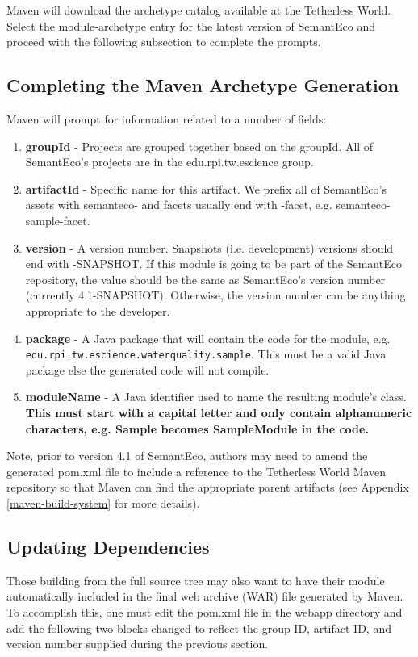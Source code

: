 \documentclass[letterpaper]{report}
\begin{document}
Maven will download the archetype catalog available at the Tetherless World. Select the module-archetype entry for the latest version of SemantEco and proceed with the following subsection to complete the prompts.

\subsection{Completing the Maven Archetype Generation}
\label{complete-maven-archetype}

Maven will prompt for information related to a number of fields:

\begin{enumerate}
\item \textbf{groupId} - Projects are grouped together based on the groupId. All of SemantEco's projects are in the edu.rpi.tw.escience group.
\item \textbf{artifactId} - Specific name for this artifact. We prefix all of SemantEco's assets with semanteco- and facets usually end with -facet, e.g. semanteco-sample-facet.
\item \textbf{version} - A version number. Snapshots (i.e. development) versions should end with -SNAPSHOT. If this module is going to be part of the SemantEco repository, the value should be the same as SemantEco's version number (currently 4.1-SNAPSHOT). Otherwise, the version number can be anything appropriate to the developer.
\item \textbf{package} - A Java package that will contain the code for the module, e.g. \\\texttt{edu.rpi.tw.escience.waterquality.sample}. This must be a valid Java package else the generated code will not compile.
\item \textbf{moduleName} - A Java identifier used to name the resulting module's class. \textbf{This must start with a capital letter and only contain alphanumeric characters, e.g. Sample becomes SampleModule in the code.}
\end{enumerate}

Note, prior to version 4.1 of SemantEco, authors may need to amend the generated pom.xml file to include a reference to the Tetherless World Maven repository so that Maven can find the appropriate parent artifacts (see Appendix \ref{maven-build-system} for more details).

\subsection{Updating Dependencies}
Those building from the full source tree may also want to have their module automatically included in the final web archive (WAR) file generated by Maven. To accomplish this, one must edit the pom.xml file in the webapp directory and add the following two blocks changed to reflect the group ID, artifact ID, and version number supplied during the previous section.
\end{document}
